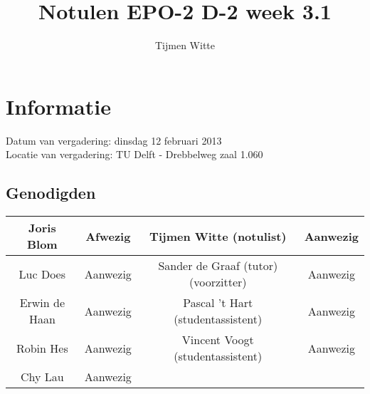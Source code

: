 \documentclass{article}
\begin{document}
\title{Notulen EPO-2 D-2 week 3.1}%
\author{Tijmen Witte}%
\maketitle

\section*{Informatie}
Datum van vergadering: dinsdag 12 februari 2013\\ %
Locatie van vergadering: TU Delft - Drebbelweg zaal 1.060 %
\subsection*{Genodigden}
\begin{center}
\begin{tabular}{|c |c |c |c |}
	\hline
	Joris Blom & Afwezig & Tijmen Witte (notulist) & Aanwezig \\
	\hline
	Luc Does & Aanwezig & Sander de Graaf (tutor)(voorzitter) & Aanwezig \\
	\hline
	Erwin de Haan & Aanwezig & Pascal 't Hart (studentassistent) & Aanwezig \\
	\hline
	Robin Hes & Aanwezig & Vincent Voogt (studentassistent) & Aanwezig \\
	\hline
	Chy Lau & Aanwezig & & \\
	\hline
\end{tabular}
\end{center}
\end{document}
